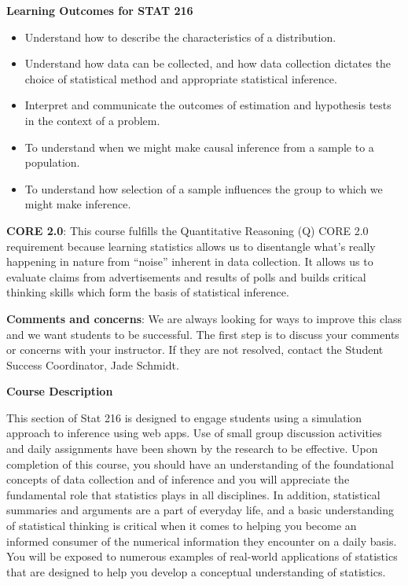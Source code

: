    \begin{center}
     {\bf Learning Outcomes for STAT 216 }
   \end{center}
   \begin{itemize}
   \item Understand how to describe the characteristics of a distribution.
   \item Understand how data can be collected, and how data collection
     dictates the choice of statistical method and appropriate
     statistical inference.
   \item Interpret and communicate the outcomes of estimation and
     hypothesis tests in the context of a problem.
   \item To understand when we might make causal inference from a
     sample to a population.
   \item To understand how selection of a sample influences the
     group to which we might make inference.
   \end{itemize}
   

{\bf CORE 2.0}:  This course fulfills the Quantitative Reasoning (Q)
CORE 2.0 requirement because learning statistics allows us to
disentangle what's really happening in nature from ``noise'' inherent in
data collection. It allows us to evaluate claims from advertisements
and results of polls and builds critical thinking skills which form
the basis of statistical inference.   

{\bf Comments and concerns}: We are always looking for ways to improve
this class and we want students to be successful.  The first step is
to discuss your comments or concerns with your instructor.  If they
are not resolved, contact the Student Success Coordinator, Jade
Schmidt.  %


 
{\bf Course Description }
 
This section of Stat 216 is designed to engage students using a
simulation approach to inference using web apps. Use of  small group
discussion activities and daily assignments have been shown by the
research to be effective. Upon completion of this
course, you should have an understanding of the foundational concepts
of data collection and of inference and you will appreciate the
fundamental role that statistics plays in all disciplines.  In
addition, statistical summaries and arguments are a part of everyday
life, and a basic understanding of statistical thinking is critical
when it comes to helping you become an informed consumer of the
numerical information they encounter on a daily basis.   You will be
exposed to numerous examples of real-world applications of statistics
that are designed to help you develop a conceptual understanding of
statistics.     
 
